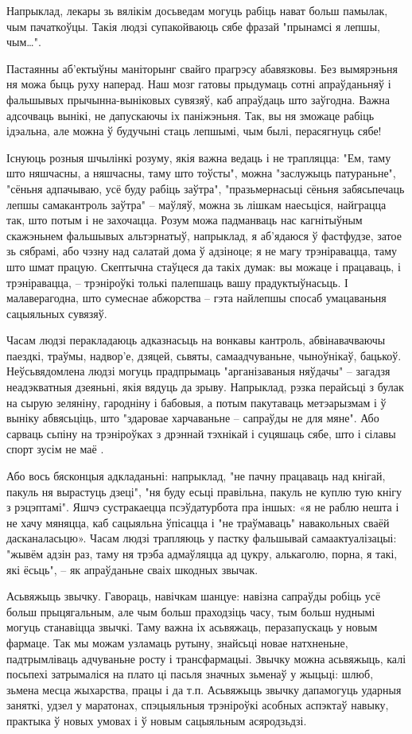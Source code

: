Напрыклад, лекары зь вялікім досьведам могуць рабіць нават больш памылак, чым пачаткоўцы. Такія людзі супакойваюць сябе фразай "прынамсі я лепшы, чым…".

Пастаянны аб'ектыўны маніторынг свайго прагрэсу абавязковы. Без вымярэньня ня можа быць руху наперад. Наш мозг гатовы прыдумаць сотні апраўданьняў і фальшывых прычынна-выніковых сувязяў, каб апраўдаць што заўгодна. Важна адсочваць вынікі, не дапускаючы іх паніжэньня. Так, вы ня зможаце рабіць ідэальна, але можна ў будучыні стаць лепшымі, чым былі, перасягнуць сябе!

Існуюць розныя шчылінкі розуму, якія важна ведаць і не трапляцца: "Ем, таму што няшчасны, а няшчасны, таму што тоўсты", можна "заслужыць патураньне", "сёньня адпачываю, усё буду рабіць заўтра", "празьмернасьці сёньня забясьпечаць лепшы самакантроль заўтра" – маўляў, можна зь лішкам наесьціся, найграцца так, што потым і не захочацца. Розум можа падманваць нас кагнітыўным скажэньнем фальшывых альтэрнатыў, напрыклад, я аб'ядаюся ў фастфудзе, затое зь сябрамі, або чэзну над салатай дома ў адзіноце; я не магу трэніравацца, таму што шмат працую. Скептычна стаўцеся да такіх думак: вы можаце і працаваць, і трэніравацца, – трэніроўкі толькі палепшаць вашу прадуктыўнасьць. І малаверагодна, што сумеснае абжорства – гэта найлепшы спосаб умацаваньня сацыяльных сувязяў.

Часам людзі перакладаюць адказнасьць на вонкавы кантроль, абвінавачваючы паездкі, траўмы, надвор'е, дзяцей, сьвяты, самаадчуваньне, чыноўнікаў, бацькоў. Неўсьвядомлена людзі могуць прадпрымаць "арганізаваныя няўдачы" – загадзя неадэкватныя дзеяньні, якія вядуць да зрыву. Напрыклад, рэзка перайсьці з булак на сырую зеляніну, гародніну і бабовыя, а потым пакутаваць метэарызмам і ў выніку абвясьціць, што "здаровае харчаваньне – сапраўды не для мяне". Або сарваць сьпіну на трэніроўках з дрэннай тэхнікай і суцяшаць сябе, што і сілавы спорт зусім не маё .

Або вось бясконцыя адкладаньні: напрыклад, "не пачну працаваць над кнігай, пакуль ня вырастуць дзеці", "ня буду есьці правільна, пакуль не куплю тую кнігу з рэцэптамі". Яшчэ сустракаецца псэўдатурбота пра іншых: «я не раблю нешта і не хачу мяняцца, каб сацыяльна ўпісацца і "не траўмаваць" навакольных сваёй дасканаласьцю». Часам людзі трапляюць у пастку фальшывай самаактуалізацыі: "жывём адзін раз, таму ня трэба адмаўляцца ад цукру, алькаголю, порна, я такі, які ёсьць", – як апраўданьне сваіх шкодных звычак.

Асьвяжыць звычку. Гавораць, навічкам шанцуе: навізна сапраўды робіць усё больш прыцягальным, але чым больш праходзіць часу, тым больш нуднымі могуць станавіцца звычкі. Таму важна іх асьвяжаць, перазапускаць у новым фармаце. Так мы можам узламаць рутыну, знайсьці новае натхненьне, падтрымліваць адчуваньне росту і трансфармацыі. Звычку можна асьвяжыць, калі посьпехі затрымаліся на плато ці пасьля значных зьменаў у жыцьці: шлюб, зьмена месца жыхарства, працы і да т.п. Асьвяжыць звычку дапамогуць ударныя заняткі, удзел у маратонах, спэцыяльныя трэніроўкі асобных аспэктаў навыку, практыка ў новых умовах і ў новым сацыяльным асяродзьдзі.

